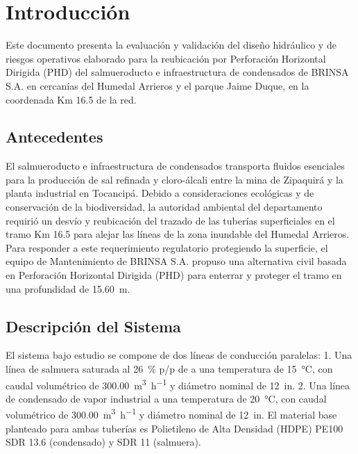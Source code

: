 \section{Introducción}
\label{sec:intro}

Este documento presenta la evaluación y validación del diseño hidráulico y de riesgos operativos elaborado para la reubicación por Perforación Horizontal Dirigida (PHD) del salmueroducto e infraestructura de condensados de BRINSA S.A. en cercanías del Humedal Arrieros y el parque Jaime Duque, en la coordenada Km 16.5 de la red.

\subsection{Antecedentes}
\label{ssec:intro_antecedentes}

El salmueroducto e infraestructura de condensados transporta fluidos esenciales para la producción de sal refinada y cloro-álcali entre la mina de Zipaquirá y la planta industrial en Tocancipá. Debido a consideraciones ecológicas y de conservación de la biodiversidad, la autoridad ambiental del departamento requirió un desvío y reubicación del trazado de las tuberías superficiales en el tramo Km 16.5 para alejar las líneas de la zona inundable del Humedal Arrieros. Para responder a este requerimiento regulatorio protegiendo la superficie, el equipo de Mantenimiento de BRINSA S.A. propuso una alternativa civil basada en Perforación Horizontal Dirigida (PHD) para enterrar y proteger el tramo en una profundidad de \SI{15.60}{\meter}.

\subsection{Descripción del Sistema}
\label{ssec:intro_descripcion}

El sistema bajo estudio se compone de dos líneas de conducción paralelas:
1. Una línea de salmuera saturada al \SI{26}{\percent} p/p de  a una temperatura de \SI{15}{\celsius}, con caudal volumétrico de \SI{300.00}{\cubic\meter\per\hour} y diámetro nominal de \SI{12}{in}.
2. Una línea de condensado de vapor industrial a una temperatura de \SI{20}{\celsius}, con caudal volumétrico de \SI{300.00}{\cubic\meter\per\hour} y diámetro nominal de \SI{12}{in}.
El material base planteado para ambas tuberías es Polietileno de Alta Densidad (HDPE) PE100 SDR 13.6 (condensado) y SDR 11 (salmuera).

